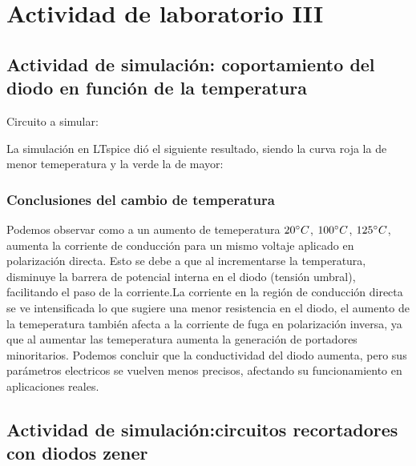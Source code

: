 \section{Actividad de laboratorio III}

	\subsection{Actividad de simulación: coportamiento del diodo en función de la temperatura}
	\sangria{} Circuito a simular:


	\sangria{} La simulación en LTspice dió el siguiente resultado, siendo la curva roja la de menor temeperatura y la verde la de mayor:

		\subsubsection{Conclusiones del cambio de temperatura}
		\sangria{} Podemos observar como a un aumento de temeperatura $20 \degree C$, $100 \degree C$, $125 \degree C $, aumenta la corriente de conducción para un  mismo voltaje aplicado en polarización directa. Esto se debe a que al incrementarse la temperatura, disminuye la barrera de potencial interna en el diodo (tensión umbral), facilitando el paso de la corriente.La corriente en la región de conducción directa se ve intensificada lo que sugiere una menor resistencia en el diodo, el aumento de la temeperatura también afecta a la corriente de fuga en polarización inversa, ya que al aumentar las temeperatura aumenta la generación de portadores minoritarios. Podemos concluir que la conductividad del diodo aumenta, pero sus parámetros electricos se vuelven menos precisos, afectando su funcionamiento en aplicaciones reales.

\newpage

	\subsection{Actividad de simulación:circuitos recortadores con diodos zener}

